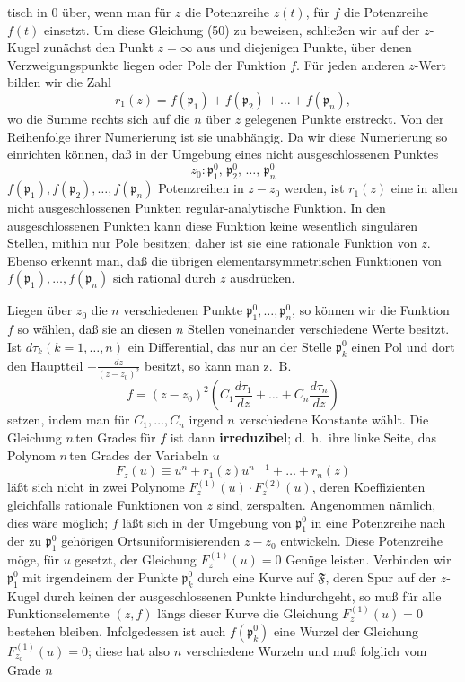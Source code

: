 \documentclass{article}
\begin{document}
tisch in 0 über, wenn man für $z$ die Potenzreihe $z(t)$, für $f$ die Potenzreihe $f(t)$ einsetzt. Um diese Gleichung (50) zu beweisen, schließen wir auf der $z$-Kugel zunächst den Punkt $z = \infty$ aus und diejenigen Punkte, über denen Verzweigungspunkte liegen oder Pole der Funktion $f$. Für jeden anderen $z$-Wert bilden wir die Zahl
\[ r_1(z) = f(\mathfrak{p}_1) + f(\mathfrak{p}_2) + \dots + f(\mathfrak{p}_n), \]
wo die Summe rechts sich auf die $n$ über $z$ gelegenen Punkte erstreckt. Von der Reihenfolge ihrer Numerierung ist sie unabhängig. Da wir diese Numerierung so einrichten können, daß in der Umgebung eines nicht ausgeschlossenen Punktes
\[ z_0 \colon \mathfrak{p}_1^0, \, \mathfrak{p}_2^0, \, \dots, \, \mathfrak{p}_n^0 \]
$f(\mathfrak{p}_1), f(\mathfrak{p}_2), \dots, f(\mathfrak{p}_n)$ Potenzreihen in $z - z_0$ werden, ist $r_1(z)$ eine in allen nicht ausgeschlossenen Punkten regulär-analytische Funktion. In den ausgeschlossenen Punkten kann diese Funktion keine wesentlich singulären Stellen, mithin nur Pole besitzen; daher ist sie eine rationale Funktion von $z$. Ebenso erkennt man, daß die übrigen elementarsymmetrischen Funktionen von $f(\mathfrak{p}_1), \dots, f(\mathfrak{p}_n)$ sich rational durch $z$ ausdrücken.

Liegen über $z_0$ die $n$ verschiedenen Punkte $\mathfrak{p}_1^0, \dots, \mathfrak{p}_n^0$, so können wir die Funktion $f$ so wählen, daß sie an diesen $n$ Stellen voneinander verschiedene Werte besitzt. Ist $d\tau_k (k = 1, \dots, n)$ ein Differential, das nur an der Stelle $\mathfrak{p}_k^0$ einen Pol und dort den Hauptteil $-\frac{dz}{(z - z_0)^2}$ besitzt, so kann man z.~B.
\[ f = (z - z_0)^2 \left( C_1 \frac{d\tau_1}{dz} + \dots + C_n \frac{d\tau_n}{dz} \right) \]
setzen, indem man für $C_1, \dots, C_n$ irgend $n$ verschiedene Konstante wählt. Die Gleichung $n$\,ten Grades für $f$ ist dann \textbf{irreduzibel}; d.~h.\ ihre linke Seite, das Polynom $n$\,ten Grades der Variabeln $u$
\[ F_z(u) \equiv u^n + r_1(z) u^{n-1} + \dots + r_n(z) \]
läßt sich nicht in zwei Polynome $F_z^{(1)}(u) \cdot F_z^{(2)}(u)$, deren Koeffizienten gleichfalls rationale Funktionen von $z$ sind, zerspalten. Angenommen nämlich, dies wäre möglich; $f$ läßt sich in der Umgebung von $\mathfrak{p}_1^0$ in eine Potenzreihe nach der zu $\mathfrak{p}_1^0$ gehörigen Ortsuniformisierenden $z - z_0$ entwickeln. Diese Potenzreihe möge, für $u$ gesetzt, der Gleichung $F_z^{(1)}(u) = 0$ Genüge leisten. Verbinden wir $\mathfrak{p}_1^0$ mit irgendeinem der Punkte $\mathfrak{p}_k^0$ durch eine Kurve auf $\mathfrak{F}$, deren Spur auf der $z$-Kugel durch keinen der ausgeschlossenen Punkte hindurchgeht, so muß für alle Funktionselemente $(z, f)$ längs dieser Kurve die Gleichung $F_z^{(1)}(u) = 0$ bestehen bleiben. Infolgedessen ist auch $f(\mathfrak{p}_k^0)$ eine Wurzel der Gleichung $F_{z_0}^{(1)}(u) = 0$; diese hat also $n$ verschiedene Wurzeln und muß folglich vom Grade $n$
\end{document}
